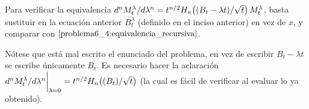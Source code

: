 Para verificar la equivalencia $d^n M^\lambda_t/d \lambda^n=t^{n/2}H_n\!\left( (B_t - \lambda t)/\sqrt{t}\right) M^\lambda_t$, basta sustituir en la ecuación anterior
$B_t^\lambda$ (definido en el inciso anterior) en vez de $x$, y comparar con $\eqref{problema6_4:equivalencia_recursiva}$.\pn 

Nótese que está mal escrito el enunciado del problema, en vez de escribir $B_t - \lambda t$ se escribe únicamente $B_t$. Es necesario hacer la aclaración
$d^n M^\lambda_t/d \lambda^n \bigg|_{\lambda = 0}=t^{n/2}H_n\!\left( (B_t)/\sqrt{t}\right) $ (la cual es fácil de verificar al evaluar lo ya obtenido).
